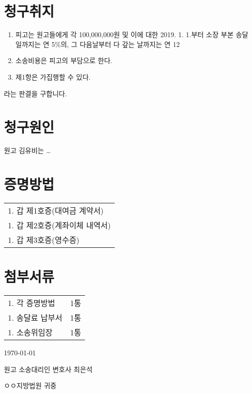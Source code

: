 \documentclass[12pt]{oblivoir}
\begin{document}
\chapter*{\large 청구취지}
\begin{enumerate}[nosep, left=0pt] %
\item 피고는 원고들에게 각 100,000,000원 및 이에 대한 2019. 1. 1.부터 소장 부본 송달일까지는 연 5\%의, 그 다음날부터 다 갚는 날까지는 연 12%
\item 소송비용은 피고의 부담으로 한다.
\item 제1항은 가집행할 수 있다.
\end{enumerate}
라는 판결을 구합니다.
\vspace{5em}
\chapter*{청구원인}
원고 김유비는 \ldots
\vspace{5em}
\chapter*{\normalfont\normalsize 증명방법}
\begin{longtabu} to \linewidth{X}
  1. 갑 제1호증(대여금 계약서)\\
  1. 갑 제2호증(계좌이체 내역서)\\
  1. 갑 제3호증(영수증)
\end{longtabu}
\vspace{5em}
\chapter*{\normalfont\normalsize 첨부서류}
\begin{longtabu} to \linewidth{X X}
  1. 각 증명방법&1통\\
  1. 송달료 납부서&1통\\
  1. 소송위임장&1통
\end{longtabu}
\vspace{5em}
\centering\today{}\par
{}
\raggedleft 원고 소송대리인 변호사 최은석\\
\raggedright ㅇㅇ지방법원 귀중
\end{document}
